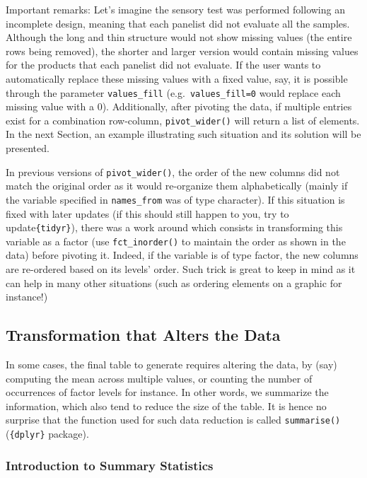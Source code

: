 \documentclass[
]{book}
\begin{document}
Important remarks: Let's imagine the sensory test was performed following an incomplete design, meaning that each panelist did not evaluate all the samples. Although the long and thin structure would not show missing values (the entire rows being removed), the shorter and larger version would contain missing values for the products that each panelist did not evaluate. If the user wants to automatically replace these missing values with a fixed value, say, it is possible through the parameter \texttt{values\_fill} (e.g.~\texttt{values\_fill=0} would replace each missing value with a 0). Additionally, after pivoting the data, if multiple entries exist for a combination row-column, \texttt{pivot\_wider()} will return a list of elements. In the next Section, an example illustrating such situation and its solution will be presented.

In previous versions of \texttt{pivot\_wider()}, the order of the new columns did not match the original order as it would re-organize them alphabetically (mainly if the variable specified in \texttt{names\_from} was of type character). If this situation is fixed with later updates (if this should still happen to you, try to update\texttt{\{tidyr\}}), there was a work around which consists in transforming this variable as a factor (use \texttt{fct\_inorder()} to maintain the order as shown in the data) before pivoting it. Indeed, if the variable is of type factor, the new columns are re-ordered based on its levels' order. Such trick is great to keep in mind as it can help in many other situations (such as ordering elements on a graphic for instance!)

\hypertarget{transformation-that-alters-the-data}{%
\subsection{Transformation that Alters the Data}\label{transformation-that-alters-the-data}}

In some cases, the final table to generate requires altering the data, by (say) computing the mean across multiple values, or counting the number of occurrences of factor levels for instance. In other words, we summarize the information, which also tend to reduce the size of the table. It is hence no surprise that the function used for such data reduction is called \texttt{summarise()} (\texttt{\{dplyr\}} package).

\hypertarget{introduction-to-summary-statistics}{%
\subsubsection{Introduction to Summary Statistics}\label{introduction-to-summary-statistics}}
\end{document}
